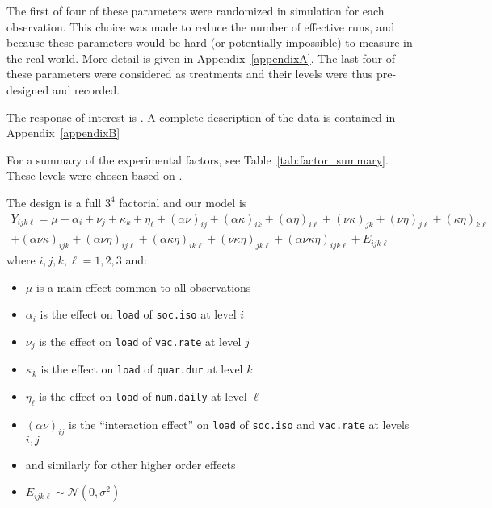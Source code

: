 \documentclass[12pt,a4paper]{article}
\begin{document}
The first of four of these parameters were randomized in simulation for each observation. This choice was made to reduce the number of effective runs, and because these parameters would be hard (or potentially impossible) to measure in the real world. More detail is given in Appendix~\ref{appendixA}. The last four of these parameters were considered as treatments and their levels were thus pre-designed and recorded. 

The response of interest is \underline{\phantom{aaaa}}. A complete description of the data is contained in Appendix~\ref{appendixB}

For a summary of the experimental factors, see Table~\ref{tab:factor_summary}. These levels were chosen based on \underline{\phantom{aaaa}}. 

The design is a full $3^4$ factorial and our model is
\vspace*{-5mm}
\begin{align*}
	Y_{ijk\ell}=\mu+\alpha_i+\nu_j+\kappa_k+\eta_\ell+(\alpha\nu)_{ij}+(\alpha\kappa)_{ik}+(\alpha\eta)_{i\ell}+(\nu\kappa)_{jk}+(\nu\eta)_{j\ell} + (\kappa\eta)_{k\ell}\\
	+(\alpha\nu\kappa)_{ijk}+(\alpha\nu\eta)_{ij\ell}+(\alpha\kappa\eta)_{ik\ell} + (\nu\kappa\eta)_{jk\ell} + (\alpha\nu\kappa\eta)_{ijk\ell}+E_{ijk\ell}
\end{align*}
where $i,j,k,\ell=1,2,3$ and:
\vspace*{-3mm}
\begin{itemize}
	\item $\mu$ is a main effect common to all observations
	\vspace*{-3mm}
	\item $\alpha_i$ is the effect on \verb`load` of \verb`soc.iso` at level $i$
	\vspace*{-3mm}
	\item $\nu_j$ is the effect on \verb`load` of \verb`vac.rate` at level $j$
	\vspace*{-3mm}
	\item $\kappa_k$ is the effect on \verb`load` of \verb`quar.dur` at level $k$
	\vspace*{-3mm}
	\item $\eta_\ell$ is the effect on \verb`load` of \verb`num.daily` at level $\ell$
	\vspace*{-3mm}
	\item $(\alpha\nu)_{ij}$ is the ``interaction effect'' on \verb`load` of \verb`soc.iso` and \verb`vac.rate` at levels $i,j$
	\vspace*{-3mm}
	\item and similarly for other higher order effects
	\vspace*{-3mm}
	\item $E_{ijk\ell}\sim\mathcal{N}(0,\sigma^2)$
\end{itemize}
\end{document}
